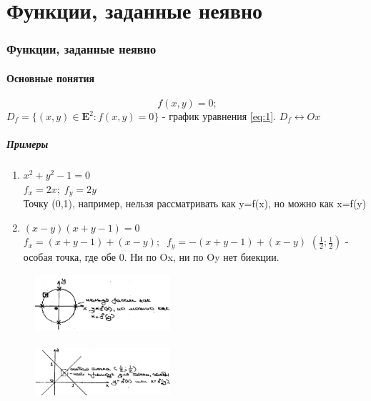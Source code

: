 \part{Функции, заданные неявно}
\section{Функции, заданные неявно}
\subsection{Основные понятия}
\begin{equation} \label{eq:1}\
f(x,y)=0; 
\end{equation}
$D_{f}=\{(x,y)\in\mathbf{E}^2: f(x,y)=0 \} $  - график уравнения \ref{eq:1}. $D_f \leftrightarrow Ox$


\begin{minipage}{100mm}
	\subsubsection{Примеры}
	\begin{enumerate}
		\item $x^2+y^2-1=0$ \\
		$f_x=2x; \; f_y=2y$ \\
		Точку (0,1), например, нельзя рассматривать как y=f(x), но можно как x=f(y)
		\item$ (x-y)(x+y-1)=0$ \\
		$f_x=(x+y-1)+(x-y); \;\; f_y=-(x+y-1)+(x-y)$
		$(\frac 1 2;\frac 1 2)$ - особая точка, где обе 0.  Ни по Ox, ни по Oy нет биекции.
	\end{enumerate}
\end{minipage}
\begin{minipage}{70mm}
	\begin{figure}[H]
		\includegraphics[width=50mm]{lect1pic1}
		\\
		\\
		\includegraphics[width=50mm]{lect1pic2}
		\\
	\end{figure}
\end{minipage}


